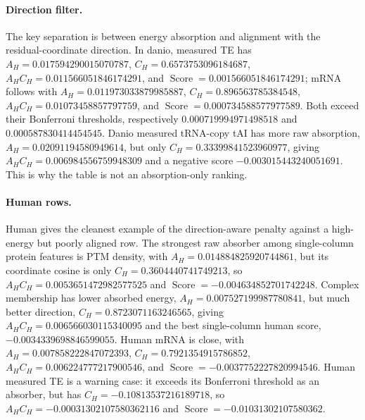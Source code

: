 \paragraph{Direction filter.}
The key separation is between energy absorption and alignment with the residual-coordinate direction.  In danio, measured TE has $A_H=0.017594290015070787$, $C_H=0.6573753096184687$, $A_HC_H=0.011566051846174291$, and $\operatorname{Score}=0.001566051846174291$; mRNA follows with $A_H=0.011973033879985887$, $C_H=0.896563785384548$, $A_HC_H=0.01073458857797759$, and $\operatorname{Score}=0.000734588577977589$.  Both exceed their Bonferroni thresholds, respectively $0.000719994971498518$ and $0.000587830414454545$.  Danio measured tRNA-copy tAI has more raw absorption, $A_H=0.02091194580949614$, but only $C_H=0.33399841523960977$, giving $A_HC_H=0.006984556759948309$ and a negative score $-0.003015443240051691$.  This is why the table is not an absorption-only ranking.

\paragraph{Human rows.}
Human gives the cleanest example of the direction-aware penalty against a high-energy but poorly aligned row.  The strongest raw absorber among single-column protein features is PTM density, with $A_H=0.014884825920744861$, but its coordinate cosine is only $C_H=0.3604440741749213$, so $A_HC_H=0.0053651472982577525$ and $\operatorname{Score}=-0.004634852701742248$.  Complex membership has lower absorbed energy, $A_H=0.007527199987780841$, but much better direction, $C_H=0.8723071163246565$, giving $A_HC_H=0.006566030115340095$ and the best single-column human score, $-0.0034339698846599055$.  Human mRNA is close, with $A_H=0.007858222847072393$, $C_H=0.7921354915786852$, $A_HC_H=0.006224777217900546$, and $\operatorname{Score}=-0.0037752227820994546$.  Human measured TE is a warning case: it exceeds its Bonferroni threshold as an absorber, but has $C_H=-0.10813537216189718$, so $A_HC_H=-0.00031302107580362116$ and $\operatorname{Score}=-0.01031302107580362$.

